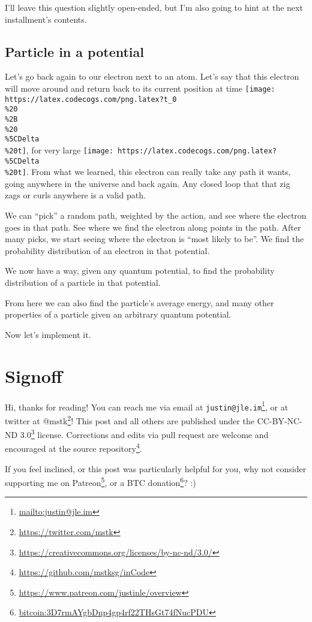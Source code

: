 \documentclass[]{article}
\renewcommand{\href}[2]{#2\footnote{\url{#1}}}
\begin{document}
I'll leave this question slightly open-ended, but I'm also going to hint at the
next installment's contents.

\hypertarget{particle-in-a-potential}{%
\subsection{Particle in a potential}\label{particle-in-a-potential}}

Let's go back again to our electron next to an atom. Let's say that this
electron will move around and return back to its current position at time
\texttt{[image: https://latex.codecogs.com/png.latex?t\_0\\\%20\\\%2B\\\%20\\\%5CDelta\\\%20t]},
for very large
\texttt{[image: https://latex.codecogs.com/png.latex?\\\%5CDelta\\\%20t]}. From what
we learned, this electron can really take any path it wants, going anywhere in
the universe and back again. Any closed loop that that zig zags or curls
anywhere is a valid path.

We can ``pick'' a random path, weighted by the action, and see where the
electron goes in that path. See where we find the electron along points in the
path. After many picks, we start seeing where the electron is ``most likely to
be''. We find the probability distribution of an electron in that potential.

We now have a way, given any quantum potential, to find the probability
distribution of a particle in that potential.

From here we can also find the particle's average energy, and many other
properties of a particle given an arbitrary quantum potential.

Now let's implement it.

\hypertarget{signoff}{%
\section{Signoff}\label{signoff}}

Hi, thanks for reading! You can reach me via email at
\href{mailto:justin@jle.im}{\nolinkurl{justin@jle.im}}, or at twitter at
\href{https://twitter.com/mstk}{@mstk}! This post and all others are published
under the \href{https://creativecommons.org/licenses/by-nc-nd/3.0/}{CC-BY-NC-ND
3.0} license. Corrections and edits via pull request are welcome and encouraged
at \href{https://github.com/mstksg/inCode}{the source repository}.

If you feel inclined, or this post was particularly helpful for you, why not
consider \href{https://www.patreon.com/justinle/overview}{supporting me on
Patreon}, or a \href{bitcoin:3D7rmAYgbDnp4gp4rf22THsGt74fNucPDU}{BTC donation}?
:)
\end{document}
